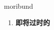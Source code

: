 
\begin{frame}
{\huge moribund}
\begin{center}
\begin{enumerate}\Large
  \item \textbf{即将过时的}
\end{enumerate}
\end{center}
\end{frame}
